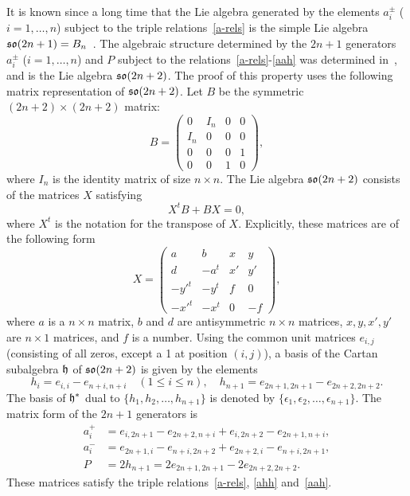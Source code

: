 \documentclass{SciPost}
\begin{document}
It is known since a long time that the Lie algebra generated by the elements $a_i^\pm$ ($i=1,\ldots,n$) subject to the triple relations~\eqref{a-rels} is the simple Lie algebra $\mathfrak{so}(2n+1)=B_n$~\cite{KT, Ryan}.
The algebraic structure determined by the $2n+1$ generators $a_i^\pm$ ($i=1,\ldots,n$) and $P$ subject to the relations~\eqref{a-rels}-\eqref{aah} was determined in~\cite{SV2026}, and is the Lie algebra $\mathfrak{so}(2n+2)$.
The proof of this property uses the following matrix representation of $\mathfrak{so}(2n+2)$.
Let $B$ be the symmetric $(2n+2)\times(2n+2)$ matrix:
\begin{equation}
B=\left( \begin{array}{cccc} 0 & I_n & 0 & 0\\ I_n & 0 & 0 &0\\ 0 & 0 & 0 & 1\\ 0 & 0 & 1 & 0 \end{array} \right),
\end{equation}
where $I_n$ is the identity matrix of size $n\times n$.
The Lie algebra $\mathfrak{so}(2n+2)$ consists of the matrices $X$ satisfying
\begin{equation}
X^t B + B X=0,
\end{equation}
where $X^t$ is the notation for the transpose of $X$.
Explicitly, these matrices are of the following form
\begin{equation}
X=\left( \begin{array}{cccc} a & b & x & y \\ d & -a^t & x' & y' \\ -{y'}^t & -y^t & f & 0 \\ -{x'}^t & -x^t & 0 & -f \end{array} \right),
\end{equation}
where $a$ is a $n\times n$ matrix, $b$ and $d$ are antisymmetric $n\times n$ matrices, $x,y,x',y'$ are $n\times 1$ matrices, and $f$ is a number.
Using the common unit matrices $e_{i,j}$ (consisting of all zeros, except a 1 at position $(i,j)$), a basis of the Cartan subalgebra $\mathfrak{h}$ of $\mathfrak{so}(2n+2)$ is given by the elements
\begin{equation}
h_i=e_{i,i}-e_{n+i,n+i}\quad (1\leq i\leq n), \quad h_{n+1}=e_{2n+1,2n+1}-e_{2n+2,2n+2}.
\end{equation}
The basis of $\mathfrak{h}^*$ dual to $\{h_1, h_2, \ldots, h_{n+1}\}$ is denoted by $\{\epsilon_1,\epsilon_2,\ldots,\epsilon_{n+1}\}$.
The matrix form of the $2n+1$ generators is
\begin{align}
a^+_i&= e_{i,2n+1}-e_{2n+2,n+i}+e_{i,2n+2}-e_{2n+1,n+i} , \nonumber\\ 
a^-_i&= e_{2n+1,i}-e_{n+i,2n+2}+e_{2n+2,i}-e_{n+i,2n+1} , \label{matrixform1}\\  
P&=2 h_{n+1} = 2e_{2n+1,2n+1}-2e_{2n+2,2n+2}. \nonumber
\end{align}
These matrices satisfy the triple relations~\eqref{a-rels}, \eqref{ahh} and~\eqref{aah}. 
\end{document}
